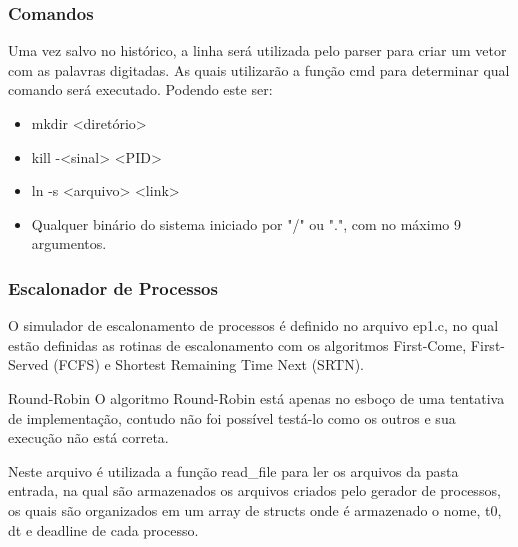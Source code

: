 \documentclass{beamer}
\begin{document}
\begin{frame}
\frametitle{Comandos}

Uma vez salvo no histórico, a linha será utilizada pelo parser para criar um vetor com as palavras digitadas. As quais
utilizarão a função cmd para determinar qual comando será executado. Podendo este ser:

\begin{itemize}
    \item mkdir <diretório>
    \item kill -<sinal> <PID>
    \item ln -s <arquivo> <link>
    \item Qualquer binário do sistema iniciado por "/" ou ".", com no máximo 9 argumentos.
\end{itemize}
\end{frame}

\begin{frame}
\frametitle{Escalonador de Processos}
O simulador de escalonamento de processos é definido no arquivo ep1.c, no qual estão definidas as rotinas de
    escalonamento com os algoritmos First-Come, First-Served (FCFS) e Shortest Remaining Time Next (SRTN).

\begin{block}{Round-Robin}
O algoritmo Round-Robin está apenas no esboço de uma tentativa de implementação, contudo não foi possível testá-lo como
os outros e sua execução não está correta.
\end{block}

Neste arquivo é utilizada a função read\_file para ler os arquivos da pasta entrada, na qual são armazenados os arquivos
criados pelo gerador de processos, os quais são organizados em um array de structs onde é armazenado o nome, t0, dt e
    deadline de cada processo.
\end{frame}
\end{document}
